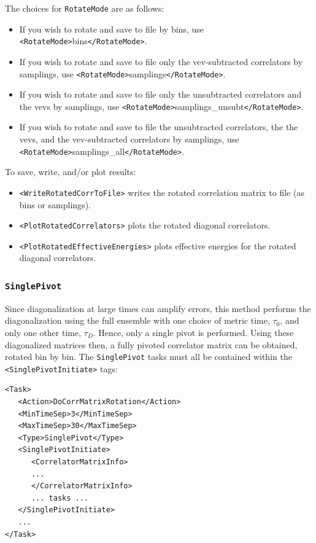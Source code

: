 \documentclass[12pt]{article}
\newcommand{\vb}{\texttt}
\begin{document}
The choices for \vb{RotateMode} are as follows:
\begin{itemize}
\item                                                                
If you wish to rotate and save to file by bins, use                           
     \vb{<RotateMode>}bins\vb{</RotateMode>}.                                        
\item
If you wish to rotate and save to file only the vev-subtracted correlators    
by samplings, use                                                             
     \vb{<RotateMode>}samplings\vb{</RotateMode>}.
\item
If you wish to rotate and save to file only the unsubtracted correlators      
and the vevs by samplings, use                                                
     \vb{<RotateMode>}samplings\_unsubt\vb{</RotateMode>}.                                
\item
If you wish to rotate and save to file the unsubtracted correlators, the      
the vevs, and the vev-subtracted correlators by samplings, use                
     \vb{<RotateMode>}samplings\_all\vb{</RotateMode>}.                                   
\end{itemize}

To save, write, and/or plot results:
\begin{itemize}
\item \vb{<WriteRotatedCorrToFile>} writes the rotated correlation matrix to file (as bins or samplings).
\item \vb{<PlotRotatedCorrelators>} plots the rotated diagonal correlators.
\item \vb{<PlotRotatedEffectiveEnergies>} plots effective energies for the rotated diagonal correlators.
\end{itemize}


\subsubsection{\vb{SinglePivot}} \label{sec:single_pivot}
Since diagonalization at large times can amplify errors, this method performs the
diagonalization using the full ensemble with one choice of metric time, $\tau_0$,
and only one other time, $\tau_D$. Hence, only a single pivot is performed.
Using these diagonalized matrices then, a fully pivoted correlator matrix can be
obtained, rotated bin by bin. The \vb{SinglePivot} tasks must all be contained
within the \vb{<SinglePivotInitiate>} tags:
\begin{verbatim}
<Task>
   <Action>DoCorrMatrixRotation</Action>
   <MinTimeSep>3</MinTimeSep>
   <MaxTimeSep>30</MaxTimeSep>
   <Type>SinglePivot</Type>
   <SinglePivotInitiate>
      <CorrelatorMatrixInfo>
      ...
      </CorrelatorMatrixInfo>
      ... tasks ...
   </SinglePivotInitiate>
   ...
</Task>
\end{verbatim}
\end{document}
